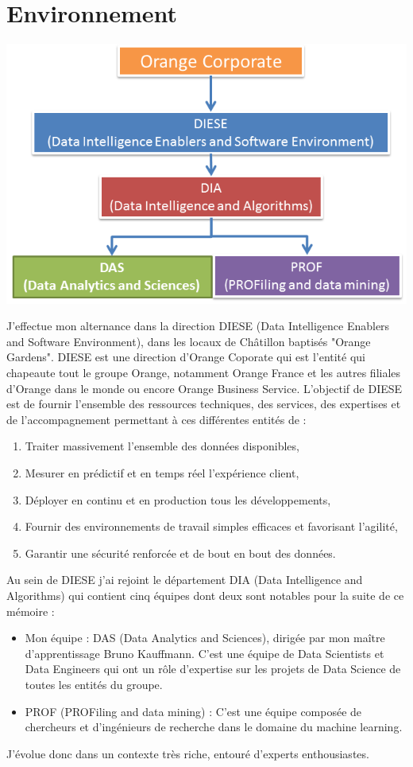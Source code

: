 \documentclass[12pt]{report}
\begin{document}
	\section*{Environnement}
	\begin{center}
		\includegraphics[scale=0.8]{schema_entites.png}\newline
	\end{center}
	J'effectue mon alternance dans la direction DIESE (Data Intelligence Enablers and Software Environment), dans les locaux de Châtillon baptisés "Orange Gardens". DIESE est une direction d'Orange Coporate qui est l'entité qui chapeaute tout le groupe Orange, notamment Orange France et les autres filiales d'Orange dans le monde ou encore Orange Business Service.
	L’objectif de DIESE est de fournir l’ensemble des ressources techniques, des services, des
	expertises et de l’accompagnement permettant à ces différentes entités de :
	\begin{enumerate}
		\item Traiter massivement l’ensemble des données disponibles,
		\item Mesurer en prédictif et en temps réel l’expérience client,
		\item Déployer en continu et en production tous les développements,
		\item Fournir des environnements de travail simples efficaces et favorisant l’agilité,
		\item Garantir une sécurité renforcée et de bout en bout des données.
	\end{enumerate}
	
	Au sein de DIESE j'ai rejoint le département DIA (Data Intelligence and Algorithms) qui contient cinq équipes dont deux sont notables pour la suite de ce mémoire :
	\begin{itemize}
		\item Mon équipe : DAS (Data Analytics and Sciences), dirigée par mon maître d'apprentissage Bruno Kauffmann. C'est une équipe de Data Scientists et Data Engineers qui ont un rôle d’expertise sur les projets de Data Science de toutes les entités du groupe.
		\item PROF (PROFiling and data mining) : C'est une équipe composée de chercheurs et d'ingénieurs de recherche dans le domaine du machine learning.
	\end{itemize}
	J'évolue donc dans un contexte très riche, entouré d'experts enthousiastes.
\end{document}

